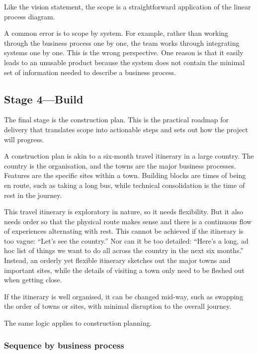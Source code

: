 \documentclass[10pt,openany,10pt]{book}
\begin{document}
Like the vision statement, the scope is a straightforward application of
the linear process diagram.

A common error is to scope by system. For example, rather than working
through the business process one by one, the team works through
integrating systems one by one. This is the wrong perspective. One
reason is that it easily leads to an unusable product because the system
does not contain the minimal set of information needed to describe a
business process.

\subsection{Stage 4---Build}\label{stage-4build}

The final stage is the construction plan. This is the practical roadmap
for delivery that translates scope into actionable steps and sets out
how the project will progress.

A construction plan is akin to a six-month travel itinerary in a large
country. The country is the organisation, and the towns are the major
business processes. Features are the specific sites within a town.
Building blocks are times of being en route, such as taking a long bus,
while technical consolidation is the time of rest in the journey.

This travel itinerary is exploratory in nature, so it needs flexibility.
But it also needs order so that the physical route makes sense and there
is a continuous flow of experiences alternating with rest. This cannot
be achieved if the itinerary is too vague: ``Let's see the country.''
Nor can it be too detailed: ``Here's a long, ad hoc list of things we
want to do all across the country in the next six months.'' Instead, an
orderly yet flexible itinerary sketches out the major towns and
important sites, while the details of visiting a town only need to be
fleshed out when getting close.

If the itinerary is well organised, it can be changed mid-way, such as
swapping the order of towns or sites, with minimal disruption to the
overall journey.

The same logic applies to construction planning.

\subsubsection{Sequence by business
process}\label{sequence-by-business-process}
\end{document}
